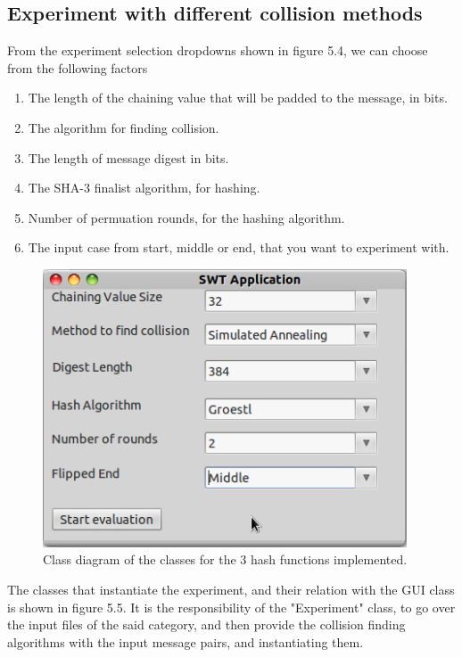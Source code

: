 \subsection{Experiment with different collision methods}

From the experiment selection dropdowns shown in figure 5.4, we can choose from the following factors
\begin{enumerate}
  \item The length of the chaining value that will be padded to the message, in bits.
  \item The algorithm for finding collision.
  \item The length of message digest in bits.
  \item The SHA-3 finalist algorithm, for hashing.
  \item Number of permuation rounds, for the hashing algorithm.
  \item The input case from start, middle or end, that you want to experiment with.
\end{enumerate}

\begin{figure}
  \begin{center}
    \includegraphics[width=4.25in]{experimentscreenshot.png}
  \end{center}
  \caption{Class diagram of the classes for the 3 hash functions implemented.}
  \label{fig:experimentscreenshot}
\end{figure}

The classes that instantiate the experiment, and their relation with the GUI class is shown in figure 5.5. It is 
the responsibility of the "Experiment" class, to go over the input files of the said category, and then provide 
the collision finding algorithms with the input message pairs, and instantiating them.

